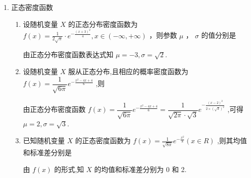 \begin{enumerate}
\begin{enumerate}
\begin{jieda}
\begin{enumerate}
            所以 $\dfrac{127}{20} \leq  k \leq  \dfrac{147}{20}$ ,
            
            因为 $k \in  {Z}$ ,所以当 $k = 7$ 时, $P\left( {Y = k}\right)$ 最大.
        \end{enumerate}
    \end{jieda}
    \end{enumerate}
    \item 正态密度函数
    \begin{enumerate}
        \item 设随机变量 $X$ 的正态分布密度函数为 $f\left( x\right)  = \frac{1}{2\sqrt{\pi }} \cdot  {{e}}^{-\frac{{\left( x + 3\right) }^{2}}{4}},x \in  \left( {-\infty , + \infty }\right)$ ，则参数 $\mu$ ， $\sigma$ 的值分别是
        \begin{jieda}
            由正态分布密度函数表达式知 $\mu  =  - 3,\sigma  = \sqrt{2}$.
        \end{jieda}
        
        \item 设随机变量 $X$ 服从正态分布,且相应的概率密度函数为 $f\left( x\right)  =  \dfrac{1}{\sqrt{6\pi }}{{e}}^{-\frac{{x}^{2} - {4x} + 4}{6}}$ ,则
        \begin{jieda}
            由正态分布密度函数 $f\left( x\right)  = \dfrac{1}{\sqrt{6\pi }}{{e}}^{-\frac{{x}^{2} - {4x} + 4}{6}} = \dfrac{1}{\sqrt{2\pi } \cdot  \sqrt{3}}{{e}}^{-\frac{{\left( x - 2\right) }^{2}}{2 \times  {\left( \sqrt{3}\right) }^{2}}}$ ,可得 $\mu  = 2,\sigma  = \sqrt{3}$.
        \end{jieda}

        \item 已知随机变量 $X$ 的正态密度函数为 $f\left( x\right)  = \frac{1}{\sqrt{8\pi }}{{e}}^{-\frac{{x}^{2}}{8}}\left( {x \in  R}\right)$ ,则其均值和标准差分别是
        \begin{jieda}
            由 $f\left( x\right)$ 的形式,知 $X$ 的均值和标准差分别为 0 和 2.
        \end{jieda}
        

\end{enumerate}
\end{enumerate}
